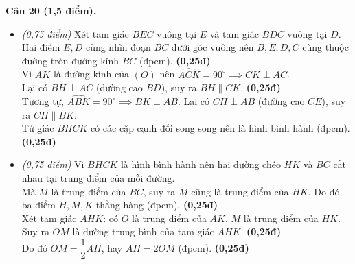 \documentclass[11pt,a4paper]{article}
\begin{document}
\vspace{1.5mm}
\noindent
\textbf{Câu 20 (1,5 điểm).}
\begin{itemize}
  \item[a)] \textit{(0,75 điểm)}
  Xét tam giác $BEC$ vuông tại $E$ và tam giác $BDC$ vuông tại $D$.\\
  Hai điểm $E, D$ cùng nhìn đoạn $BC$ dưới góc vuông nên $B, E, D, C$ cùng thuộc đường tròn đường kính $BC$ (đpcm). \dotfill \textbf{(0,25đ)}\\
  Vì $AK$ là đường kính của $(O)$ nên $\widehat{ACK} = 90^\circ \implies CK \perp AC$.\\
  Lại có $BH \perp AC$ (đường cao $BD$), suy ra $BH \parallel CK$. \dotfill \textbf{(0,25đ)}\\
  Tương tự, $\widehat{ABK} = 90^\circ \implies BK \perp AB$. Lại có $CH \perp AB$ (đường cao $CE$), suy ra $CH \parallel BK$.\\
  Tứ giác $BHCK$ có các cặp cạnh đối song song nên là hình bình hành (đpcm). \dotfill \textbf{(0,25đ)}

  \item[b)] \textit{(0,75 điểm)}
  Vì $BHCK$ là hình bình hành nên hai đường chéo $HK$ và $BC$ cắt nhau tại trung điểm của mỗi đường.\\
  Mà $M$ là trung điểm của $BC$, suy ra $M$ cũng là trung điểm của $HK$. Do đó ba điểm $H, M, K$ thẳng hàng (đpcm). \dotfill \textbf{(0,25đ)}\\
  Xét tam giác $AHK$: có $O$ là trung điểm của $AK$, $M$ là trung điểm của $HK$.\\
  Suy ra $OM$ là đường trung bình của tam giác $AHK$. \dotfill \textbf{(0,25đ)}\\
  Do đó $OM = \dfrac{1}{2} AH$, hay $AH = 2 OM$ (đpcm). \dotfill \textbf{(0,25đ)}
\end{itemize}
\end{document}

